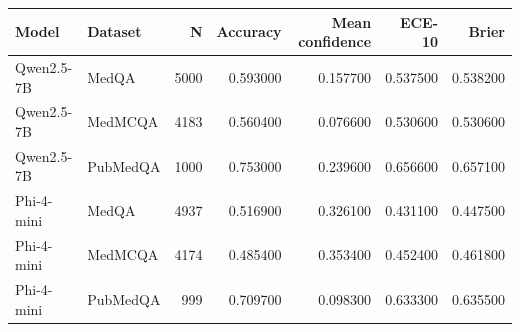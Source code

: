 \begin{tabular}{llrrrrr}
\toprule
Model & Dataset & N & Accuracy & Mean confidence & ECE-10 & Brier \\
\midrule
Qwen2.5-7B & MedQA & 5000 & 0.593000 & 0.157700 & 0.537500 & 0.538200 \\
Qwen2.5-7B & MedMCQA & 4183 & 0.560400 & 0.076600 & 0.530600 & 0.530600 \\
Qwen2.5-7B & PubMedQA & 1000 & 0.753000 & 0.239600 & 0.656600 & 0.657100 \\
Phi-4-mini & MedQA & 4937 & 0.516900 & 0.326100 & 0.431100 & 0.447500 \\
Phi-4-mini & MedMCQA & 4174 & 0.485400 & 0.353400 & 0.452400 & 0.461800 \\
Phi-4-mini & PubMedQA & 999 & 0.709700 & 0.098300 & 0.633300 & 0.635500 \\
\bottomrule
\end{tabular}
